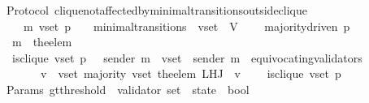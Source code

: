 \begin{isabellebody}
%
\endisatagproof
{\isafoldproof}%
%
\isadelimproof
\isanewline
%
\endisadelimproof
\isanewline
\isanewline
{}\isamarkupfalse%
\ {\isacharparenleft}\ Protocol{\isacharparenright}\ clique{\isacharunderscore}not{\isacharunderscore}affected{\isacharunderscore}by{\isacharunderscore}minimal{\isacharunderscore}transitions{\isacharunderscore}outside{\isacharunderscore}clique\ {\isacharcolon}\isanewline
\ \ {\isachardoublequoteopen}{\isasymforall}\ {\isasymsigma}\ {\isasymsigma}{\isacharprime}\ m{\isacharprime}\ v{\isacharunderscore}set\ p{\isachardot}\ {\isacharparenleft}{\isasymsigma}{\isacharcomma}\ {\isasymsigma}{\isacharprime}{\isacharparenright}\ {\isasymin}\ minimal{\isacharunderscore}transitions\ {\isasymand}\ v{\isacharunderscore}set\ {\isasymsubseteq}\ V\ \isanewline
\ \ {\isasymlongrightarrow}\ majority{\isacharunderscore}driven\ p\isanewline
\ \ {\isasymlongrightarrow}\ m{\isacharprime}\ {\isacharequal}\ the{\isacharunderscore}elem\ {\isacharparenleft}{\isasymsigma}{\isacharprime}\ {\isacharminus}\ {\isasymsigma}{\isacharparenright}\isanewline
\ \ {\isasymlongrightarrow}\ is{\isacharunderscore}clique\ {\isacharparenleft}v{\isacharunderscore}set{\isacharcomma}\ p{\isacharcomma}\ {\isasymsigma}{\isacharparenright}\ {\isasymand}\ sender\ m{\isacharprime}\ {\isasymin}\ v{\isacharunderscore}set\ {\isasymand}\ sender\ m{\isacharprime}\ {\isasymnotin}\ equivocating{\isacharunderscore}validators\ {\isasymsigma}{\isacharprime}\isanewline
\ \ \ \ \ \ {\isasymand}\ {\isacharparenleft}{\isasymforall}\ v\ {\isasymin}\ v{\isacharunderscore}set{\isachardot}\ majority\ {\isacharparenleft}v{\isacharunderscore}set{\isacharcomma}\ the{\isacharunderscore}elem\ {\isacharparenleft}L{\isacharunderscore}H{\isacharunderscore}J\ {\isasymsigma}\ v{\isacharparenright}{\isacharparenright}{\isacharparenright}\ \isanewline
\ \ {\isasymlongrightarrow}\ is{\isacharunderscore}clique\ {\isacharparenleft}v{\isacharunderscore}set{\isacharcomma}\ p{\isacharcomma}\ {\isasymsigma}{\isacharprime}{\isacharparenright}{\isachardoublequoteclose}\isanewline
%
\isadelimproof
\ \ %
\endisadelimproof
%
\isatagproof
{}\isamarkupfalse%
%
\endisatagproof
{\isafoldproof}%
%
\isadelimproof
\isanewline
%
\endisadelimproof
\isanewline
\isanewline
\isanewline
\isanewline
\ \isanewline
{}\isamarkupfalse%
\ {\isacharparenleft}\ Params{\isacharparenright}\ gt{\isacharunderscore}threshold\ {\isacharcolon}{\isacharcolon}\ {\isachardoublequoteopen}{\isacharparenleft}validator\ set\ {\isacharasterisk}\ state{\isacharparenright}\ {\isasymRightarrow}\ bool{\isachardoublequoteclose}\isanewline

\end{isabellebody}
